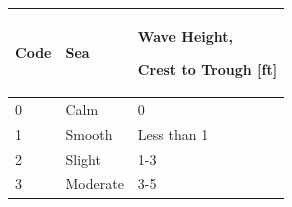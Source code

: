 \documentclass[
]{book}
\begin{document}
\begin{longtable}[]{@{}lll@{}}
\toprule
\begin{minipage}[b]{0.08\columnwidth}\raggedright
Code\strut
\end{minipage} & \begin{minipage}[b]{0.56\columnwidth}\raggedright
Sea\strut
\end{minipage} & \begin{minipage}[b]{0.27\columnwidth}\raggedright
Wave Height,

Crest to Trough {[}ft{]}\strut
\end{minipage}\tabularnewline
\midrule
\endhead
\begin{minipage}[t]{0.08\columnwidth}\raggedright
0\strut
\end{minipage} & \begin{minipage}[t]{0.56\columnwidth}\raggedright
Calm\strut
\end{minipage} & \begin{minipage}[t]{0.27\columnwidth}\raggedright
0\strut
\end{minipage}\tabularnewline
\begin{minipage}[t]{0.08\columnwidth}\raggedright
1\strut
\end{minipage} & \begin{minipage}[t]{0.56\columnwidth}\raggedright
Smooth\strut
\end{minipage} & \begin{minipage}[t]{0.27\columnwidth}\raggedright
Less than 1\strut
\end{minipage}\tabularnewline
\begin{minipage}[t]{0.08\columnwidth}\raggedright
2\strut
\end{minipage} & \begin{minipage}[t]{0.56\columnwidth}\raggedright
Slight\strut
\end{minipage} & \begin{minipage}[t]{0.27\columnwidth}\raggedright
1-3\strut
\end{minipage}\tabularnewline
\begin{minipage}[t]{0.08\columnwidth}\raggedright
3\strut
\end{minipage} & \begin{minipage}[t]{0.56\columnwidth}\raggedright
Moderate\strut
\end{minipage} & \begin{minipage}[t]{0.27\columnwidth}\raggedright
3-5\strut
\end{minipage}\tabularnewline

\end{longtable}
\end{document}
